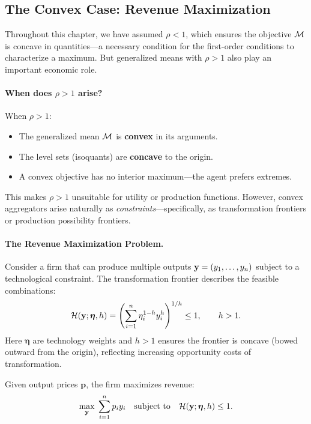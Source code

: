 \subsection{The Convex Case: Revenue Maximization}
\label{subsec:convex-case}

Throughout this chapter, we have assumed $\rho < 1$, which ensures the objective $\mathcal{M}$ is concave in quantities---a necessary condition for the first-order conditions to characterize a maximum. But generalized means with $\rho > 1$ also play an important economic role.

\paragraph{When does $\rho > 1$ arise?}
When $\rho > 1$:
\begin{itemize}[leftmargin=2em]
\item The generalized mean $\mathcal{M}$ is \textbf{convex} in its arguments.
\item The level sets (isoquants) are \textbf{concave} to the origin.
\item A convex objective has no interior maximum---the agent prefers extremes.
\end{itemize}

This makes $\rho > 1$ unsuitable for utility or production functions. However, convex aggregators arise naturally as \emph{constraints}---specifically, as transformation frontiers or production possibility frontiers.

\paragraph{The Revenue Maximization Problem.}
Consider a firm that can produce multiple outputs $\mathbf{y} = (y_1, \ldots, y_n)$ subject to a technological constraint. The transformation frontier describes the feasible combinations:
\begin{equation}
\mathcal{H}(\mathbf{y}; \bm{\eta}, h) = \left( \sum_{i=1}^{n} \eta_i^{1-h} y_i^{h} \right)^{1/h} \leq 1, \qquad h > 1.
\end{equation}
Here $\bm{\eta}$ are technology weights and $h > 1$ ensures the frontier is concave (bowed outward from the origin), reflecting increasing opportunity costs of transformation.

Given output prices $\mathbf{p}$, the firm maximizes revenue:
\begin{equation}
\label{eq:revenue-max}
\max_{\mathbf{y}} \; \sum_{i=1}^{n} p_i y_i \quad \text{subject to} \quad \mathcal{H}(\mathbf{y}; \bm{\eta}, h) \leq 1.
\end{equation}

